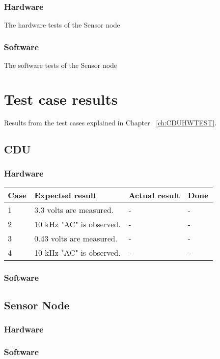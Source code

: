 \subsubsection{Hardware}
The hardware tests of the Sensor node
\subsubsection{Software}
The software tests of the Sensor node

\section{Test case results}
Results from the test cases explained in Chapter ~\ref{ch:CDUHWTEST}.
\subsection{CDU}
\subsubsection{Hardware}
\begin{table}
\begin{tabular}{| p{1cm} | p{4cm} | p{6cm} | p{1cm} |}
\hline
Case 		&Expected result 		&Actual result 		&Done\\
\hline
1 			&3.3 volts are measured. & - 				& - \\
\hline
2 			&10 kHz "AC" is observed. & - 				& - \\
\hline
3 			&0.43 volts are measured. & - 				& - \\
\hline
4 			&10 kHz "AC" is observed. & - 				& - \\
\hline
\end{tabular}
\end{table}
\subsubsection{Software}

\subsection{Sensor Node}
\subsubsection{Hardware}
\subsubsection{Software}
